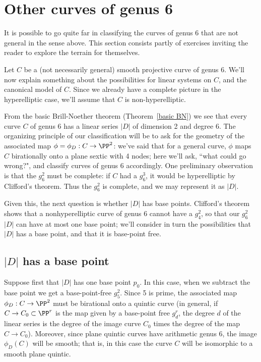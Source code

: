 \section{Other curves of genus 6}

It is possible to go quite far in classifying the curves of genus 6 that are not general in the sense above. This section consists partly of exercises inviting the reader to explore the terrain for themselves.


Let $C$ be a (not necessarily general) smooth projective curve of genus 6. We'll now explain something about the possibilities for  linear systems on $C$, and the canonical model of $C$. Since we already have a complete picture in the hyperelliptic case, we'll assume that $C$ is non-hyperelliptic.

From the basic Brill-Noether theorem (Theorem~\ref{basic BN}) we see that every curve $C$ of genus 6 has a linear series $|D|$ of dimension 2
and degree 6. The organizing principle of our classification will be to ask for the geometry of the associated map $\phi = \phi_D : C \to \PP^2$: we've said that for a general curve,  $\phi$ maps $C$ birationally onto a plane sextic with 4 nodes; here we'll ask, ``what could go wrong?", and classify curves of genus 6 accordingly. One preliminary observation is that  the $g^2_6$ must be complete:  if $C$ had a $g^3_6$, it would be hyperelliptic by Clifford's theorem. Thus the $g^2_6$ is complete, and we may represent it as $|D|$.

Given this, the next question is whether $|D|$ has base points.  Clifford's theorem shows that a nonhyperelliptic curve of genus 6 cannot have a $g^2_4$, so that our $g^2_6$ $|D|$ can have at most one base point; we'll consider in turn the possibilities that $|D|$ has a base point, and that it is base-point free.



\subsection{$|D|$ has a base point}\label{g26 has a base point}

Suppose first that $|D|$ has one base point $p_0$. In this case, when we subtract the base point we get a base-point-free $g^2_5$. Since 5 is prime, the associated map $\phi_D : C \to \PP^2$ must be birational onto a quintic curve (in general, if $C \to C_0 \subset \PP^r$ is the map given by a base-point free $g^r_d$, the degree $d$ of the linear series is the degree of the image curve $C_0$ times the degree of the map $C \to C_0$). Moreover, since plane quintic curves have arithmetic genus 6, the image $\phi_D(C)$ will be smooth; that is, in this case the curve $C$ will be isomorphic to a smooth plane quintic.

